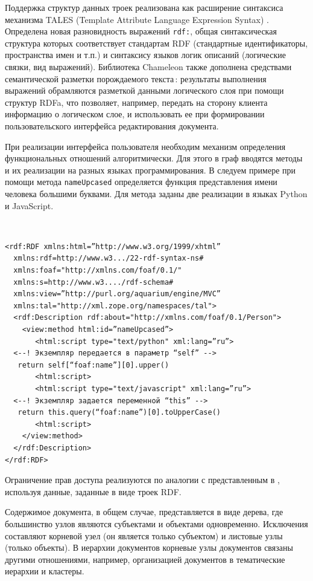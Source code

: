 \documentclass[utf8]{../IncArticle}
\begin{document}
Поддержка структур данных троек реализована как расширение синтаксиса
механизма TALES (Template Attribute Language Expression Syntax)
\cite{zopetal}.  Определена новая разновидность выражений
\texttt{rdf:}, общая синтаксическая структура которых соответствует
стандартам RDF (стандартные идентификаторы, пространства имен и т.п.)
и синтаксису языков логик описаний (логические связки, вид выражений).
Библиотека Chameleon также дополнена средствами семантической разметки
порождаемого текста\,: результаты выполнения выражений обрамляются
разметкой данными логического слоя при помощи структур RDFa, что
позволяет, например, передать на сторону клиента информацию о
логическом слое, и использовать ее при формировании пользовательского
интерфейса редактирования документа.

При реализации интерфейса пользователя необходим механизм определения
функциональных отношений алгоритмически.  Для этого в граф вводятся
методы и их реализации на разных языках программирования.  В следуем примере при
помощи метода \texttt{nameUpcased} определяется функция представления
имени человека большими буквами.  Для метода заданы две реализации в
языках Python и JavaScript.

\begingroup
\tt
\begin{verbatim}
<rdf:RDF xmlns:html=”http://www.w3.org/1999/xhtml”
  xmlns:rdf=http://www.w3.../22-rdf-syntax-ns#
  xmlns:foaf="http://xmlns.com/foaf/0.1/"
  xmlns:s=http://www.w3..../rdf-schema#
  xmlns:view=”http://purl.org/aquarium/engine/MVC”
  xmlns:tal="http://xml.zope.org/namespaces/tal">
  <rdf:Description rdf:about="http://xmlns.com/foaf/0.1/Person">
    <view:method html:id=”nameUpcased”>
       <html:script type="text/python" xml:lang=”ru”>
  <--! Экземпляр передается в параметр “self” -->
   return self[“foaf:name”][0].upper()
       <html:script>
       <html:script type="text/javascript" xml:lang=”ru”>
  <--! Экземпляр задается переменной “this” -->
   return this.query(“foaf:name”)[0].toUpperCase()
       <html:script>
    </view:method>
  </rdf:Description>
</rdf:RDF>
\end{verbatim}
\endgroup

Ограничение прав доступа реализуются по аналогии с представленным в
\cite{b2:6,b2:7}, используя данные, заданные в виде троек RDF.

Содержимое документа, в общем случае, представляется в виде дерева,
где большинство узлов являются субъектами и объектами
одновременно. Исключения составляют корневой узел (он является только
субъектом) и листовые узлы (только объекты).  В иерархии документов
корневые узлы документов связаны другими отношениями, например,
организацией документов в тематические иерархии и кластеры.
\end{document}
